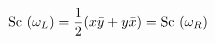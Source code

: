 \begin{equation}
{\rm Sc}~(\omega_{L}) = \frac{1}{2}(x \bar{y}+y\bar{x}) = {\rm Sc}~(\omega_{R})
\end{equation}

